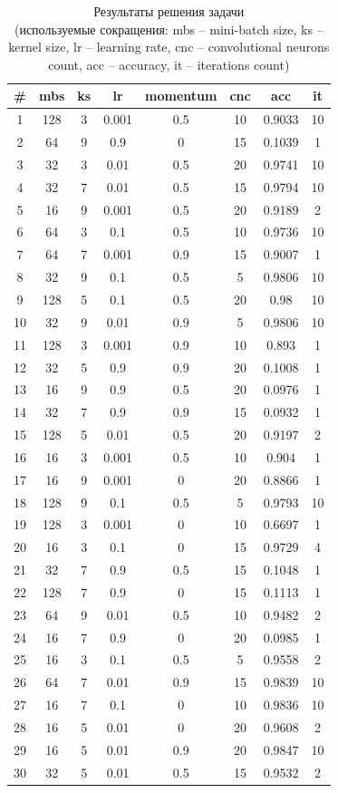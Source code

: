 				\begin{table}[ht]
					\caption{Результаты решения задачи \\(используемые сокращения: mbs -- mini-batch size, ks -- kernel size, lr -- learning rate, cnc -- convolutional neurons count, acc -- accuracy, it -- iterations count)}
					\centering
					\begin{tabular}{c c c c c c c c}
						\hline\hline
						\# & mbs & ks & lr & momentum & cnc & acc & it \\ [0.5ex] %
						\hline
						1&128&3&0.001&0.5&10&0.9033&10 \\
						2&64&9&0.9&0&15&0.1039&1 \\
						3&32&3&0.01&0.5&20&0.9741&10\\
						4&32&7&0.01&0.5&15&0.9794&10\\
						5&16&9&0.001&0.5&20&0.9189&2\\
						6&64&3&0.1&0.5&10&0.9736&10\\
						7&64&7&0.001&0.9&15&0.9007&1\\
						8&32&9&0.1&0.5&5&0.9806&10\\
						9&128&5&0.1&0.5&20&0.98&10\\
						10&32&9&0.01&0.9&5&0.9806&10\\
						11&128&3&0.001&0.9&10&0.893&1\\
						12&32&5&0.9&0.9&20&0.1008&1\\
						13&16&9&0.9&0.5&20&0.0976&1\\
						14&32&7&0.9&0.9&15&0.0932&1\\
						15&128&5&0.01&0.5&20&0.9197&2\\
						16&16&3&0.001&0.5&10&0.904&1\\
						17&16&9&0.001&0&20&0.8866&1\\
						18&128&9&0.1&0.5&5&0.9793&10\\
						19&128&3&0.001&0&10&0.6697&1\\
						20&16&3&0.1&0&15&0.9729&4\\
						21&32&7&0.9&0.5&15&0.1048&1\\
						22&128&7&0.9&0&15&0.1113&1\\
						23&64&9&0.01&0.5&10&0.9482&2\\
						24&16&7&0.9&0&20&0.0985&1\\
						25&16&3&0.1&0.5&5&0.9558&2\\
						26&64&7&0.01&0.9&15&0.9839&10\\
						27&16&7&0.1&0&10&0.9836&10\\
						28&16&5&0.01&0&20&0.9608&2\\
						29&16&5&0.01&0.9&20&0.9847&10\\
						30&32&5&0.01&0.5&15&0.9532&2\\
						\hline
					\end{tabular}
					\label{table:nonlin}
				\end{table}
				
